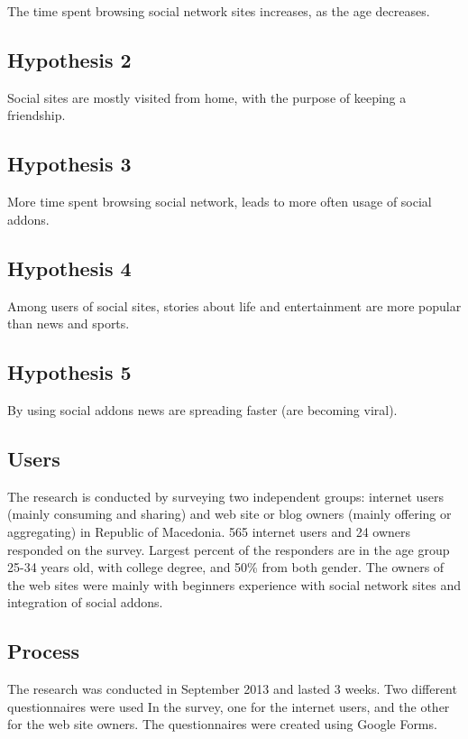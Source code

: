 \documentclass[conference]{IEEEtran}
\begin{document}
The time spent browsing social network sites increases, as the age decreases.

\subsection{Hypothesis 2}

Social sites are mostly visited from home, with the purpose of keeping a
friendship.

\subsection{Hypothesis 3}

More time spent browsing social network, leads to more often usage of social
addons.

\subsection{Hypothesis 4}

Among users of social sites, stories about life and entertainment are more
popular than news and sports.

\subsection{Hypothesis 5}

By using social addons news are spreading faster (are becoming viral).


\subsection{Users}

The research is conducted by surveying two independent groups: internet users
(mainly consuming and sharing) and web site or blog owners (mainly offering or
aggregating) in Republic of Macedonia. 565 internet users and 24 owners
responded on the survey. Largest percent of the responders are in the age group
25-34 years old, with college degree, and 50\% from both gender. The owners of the web
sites were mainly with beginners experience with social network sites and
integration of social addons.

\subsection{Process}

The research was conducted in September 2013 and lasted 3 weeks. Two different
questionnaires were used In the survey, one for the internet users, and the
other for the web site owners. The questionnaires were created using Google
Forms.
\end{document}
